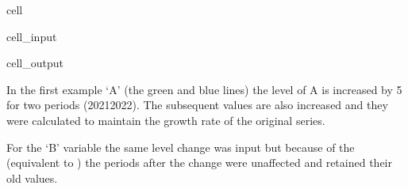 \documentclass[letterpaper,10pt,english]{jupyterBook}
\begin{document}
\begin{sphinxuseclass}{cell}\begin{sphinxVerbatimInput}

\begin{sphinxuseclass}{cell_input}
\begin{sphinxVerbatim}[commandchars=\\\{\}]

\PYG{p}{[}\PYG{p}{[}\PYG{p}{]}\PYG{p}{]}
    
\end{sphinxVerbatim}

\end{sphinxuseclass}\end{sphinxVerbatimInput}
\begin{sphinxVerbatimOutput}

\begin{sphinxuseclass}{cell_output}
\noindent{}

\end{sphinxuseclass}\end{sphinxVerbatimOutput}

\end{sphinxuseclass}
\sphinxAtStartPar
In the first example ‘A’ (the green and blue lines) the level of A is increased by 5 for two periods (2021\sphinxhyphen{}2022). The subsequent values are also increased and they were calculated to maintain the growth rate of the original series.

\sphinxAtStartPar
For the ‘B’ variable the same level change was input but because of the  (equivalent to ) the periods after the change were unaffected and retained their old values.
\end{document}
